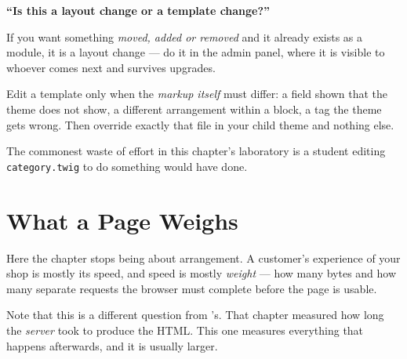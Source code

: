 \begin{conceptbox}
\textbf{``Is this a layout change or a template change?''}

\smallskip
If you want something \emph{moved, added or removed} and it already exists as a
module, it is a layout change --- do it in the admin panel, where it is
visible to whoever comes next and survives upgrades.

\smallskip
Edit a template only when the \emph{markup itself} must differ: a field shown
that the theme does not show, a different arrangement within a block, a tag the
theme gets wrong. Then override exactly that file in your child theme and
nothing else.

\smallskip
The commonest waste of effort in this chapter's laboratory is a student editing
\texttt{category.twig} to do something  would have
done.
\end{conceptbox}

\section{What a Page Weighs}

Here the chapter stops being about arrangement. A customer's experience of your
shop is mostly its speed, and speed is mostly \emph{weight} --- how many bytes
and how many separate requests the browser must complete before the page is
usable.

Note that this is a different question from 's. That chapter
measured how long the \emph{server} took to produce the HTML. This one measures
everything that happens afterwards, and it is usually larger.

